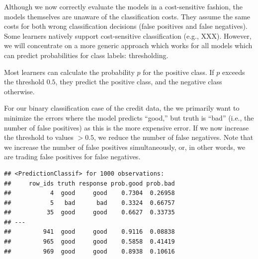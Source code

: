 \documentclass[
]{scrbook}
\newenvironment{Shaded}{\begin{snugshade}}{\end{snugshade}}
\newcommand{\AttributeTok}[1]{\textcolor[rgb]{0.77,0.63,0.00}{#1}}
\newcommand{\CommentTok}[1]{\textcolor[rgb]{0.56,0.35,0.01}{\textit{#1}}}
\newcommand{\FunctionTok}[1]{\textcolor[rgb]{0.00,0.00,0.00}{#1}}
\newcommand{\NormalTok}[1]{#1}
\newcommand{\OtherTok}[1]{\textcolor[rgb]{0.56,0.35,0.01}{#1}}
\newcommand{\SpecialCharTok}[1]{\textcolor[rgb]{0.00,0.00,0.00}{#1}}
\newcommand{\StringTok}[1]{\textcolor[rgb]{0.31,0.60,0.02}{#1}}
\renewenvironment{Shaded} {\begin{snugshade}\small} {\end{snugshade}}
\begin{document}
Although we now correctly evaluate the models in a cost-sensitive fashion, the models themselves are unaware of the classification costs.
They assume the same costs for both wrong classification decisions (false positives and false negatives).
Some learners natively support cost-sensitive classification (e.g., XXX).
However, we will concentrate on a more generic approach which works for all models which can predict probabilities for class labels: thresholding.

Most learners can calculate the probability \(p\) for the positive class.
If \(p\) exceeds the threshold \(0.5\), they predict the positive class, and the negative class otherwise.

For our binary classification case of the credit data, the we primarily want to minimize the errors where the model predicts ``good,'' but truth is ``bad'' (i.e., the number of false positives) as this is the more expensive error.
If we now increase the threshold to values \(> 0.5\), we reduce the number of false negatives.
Note that we increase the number of false positives simultaneously, or, in other words, we are trading false positives for false negatives.

\begin{Shaded}
\end{Shaded}

\begin{verbatim}
## <PredictionClassif> for 1000 observations:
##     row_ids truth response prob.good prob.bad
##           4  good     good    0.7304  0.26958
##           5   bad      bad    0.3324  0.66757
##          35  good     good    0.6627  0.33735
## ---                                          
##         941  good     good    0.9116  0.08838
##         965  good     good    0.5858  0.41419
##         969  good     good    0.8938  0.10616
\end{verbatim}
\end{document}
